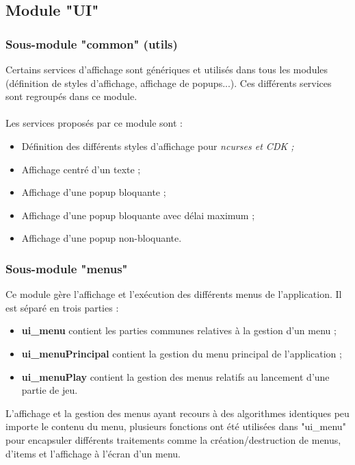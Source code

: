 \documentclass{book}
\begin{document}
\subsection{Module "UI"}
\subsubsection{Sous-module "common" (utils)}

Certains services d'affichage sont génériques et utilisés dans tous les modules (définition de styles d'affichage, affichage de popups...). Ces différents services sont regroupés dans ce module.

\paragraph{}
Les services proposés par ce module sont :
\begin{itemize}
	\item Définition des différents styles d'affichage pour \em{ncurses} et \em{CDK} ;
	\item Affichage centré d'un texte ;
	\item Affichage d'une popup bloquante ;
	\item Affichage d'une popup bloquante avec délai maximum ;
	\item Affichage d'une popup non-bloquante.
\end{itemize}


\subsubsection{Sous-module "menus"}

Ce module gère l'affichage et l'exécution des différents menus de l'application. Il est séparé en trois parties :

\begin{itemize}
	\item \textbf{ui\_menu} contient les parties communes relatives à la gestion d'un menu ;
	\item \textbf{ui\_menuPrincipal} contient la gestion du menu principal de l'application ;
	\item \textbf{ui\_menuPlay} contient la gestion des menus relatifs au lancement d'une partie de jeu.
\end{itemize}

L'affichage et la gestion des menus ayant recours à des algorithmes identiques peu importe le contenu du menu, plusieurs fonctions ont été utilisées dans "ui\_menu" pour encapsuler différents traitements comme la création/destruction de menus, d'items et l'affichage à l'écran d'un menu.
\end{document}
